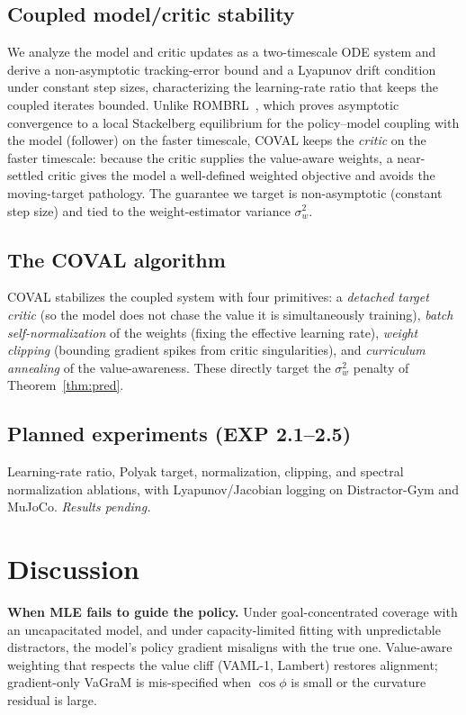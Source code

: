 \documentclass{article}
\theoremstyle{plain}
\begin{document}
\subsection{Coupled model/critic stability}
\label{sec:coval-theory}
We analyze the model and critic updates as a two-timescale ODE system and derive a
non-asymptotic tracking-error bound and a Lyapunov drift condition under constant step
sizes, characterizing the learning-rate ratio that keeps the coupled iterates bounded.
Unlike ROMBRL~\citep{chen2026rombri}, which proves asymptotic convergence to a local
Stackelberg equilibrium for the policy--model coupling with the model (follower) on the
faster timescale, COVAL keeps the \emph{critic} on the faster timescale: because the
critic supplies the value-aware weights, a near-settled critic gives the model a
well-defined weighted objective and avoids the moving-target pathology. The guarantee we
target is non-asymptotic (constant step size) and tied to the weight-estimator variance
$\sigma_w^2$.

\subsection{The COVAL algorithm}
\label{sec:coval-alg}
COVAL stabilizes the coupled system with four primitives: a \emph{detached target
critic} (so the model does not chase the value it is simultaneously training),
\emph{batch self-normalization} of the weights (fixing the effective learning rate),
\emph{weight clipping} (bounding gradient spikes from critic singularities), and
\emph{curriculum annealing} of the value-awareness. These directly target the
$\sigma_w^2$ penalty of Theorem~\ref{thm:pred}.

\subsection{Planned experiments (EXP 2.1--2.5)}
\label{sec:coval-exp}
Learning-rate ratio, Polyak target, normalization, clipping, and spectral normalization
ablations, with Lyapunov/Jacobian logging on Distractor-Gym and MuJoCo. \emph{Results
pending.}

\section{Discussion}

\textbf{When MLE fails to guide the policy.} Under goal-concentrated coverage with an
uncapacitated model, and under capacity-limited fitting with unpredictable distractors,
the model's policy gradient misaligns with the true one. Value-aware weighting that
respects the value cliff (VAML-1, Lambert) restores alignment; gradient-only VaGraM is
mis-specified when $\cos\phi$ is small or the curvature residual is large.
\end{document}
